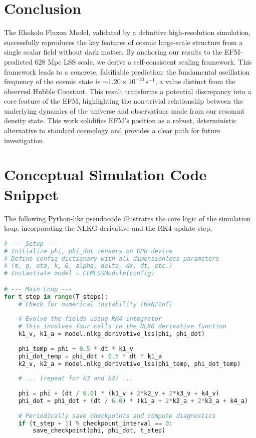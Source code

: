 \documentclass[11pt]{article}
\begin{document}
\section{Conclusion}
The Ehokolo Fluxon Model, validated by a definitive high-resolution simulation, successfully reproduces the key features of cosmic large-scale structure from a single scalar field without dark matter. By anchoring our results to the EFM-predicted 628 Mpc LSS scale, we derive a self-consistent scaling framework. This framework leads to a concrete, falsifiable prediction: the fundamental oscillation frequency of the cosmic state is \(\sim 1.20 \times 10^{-20} \, \text{s}^{-1}\), a value distinct from the observed Hubble Constant. This result transforms a potential discrepancy into a core feature of the EFM, highlighting the non-trivial relationship between the underlying dynamics of the universe and observations made from our resonant density state. This work solidifies EFM's position as a robust, deterministic alternative to standard cosmology and provides a clear path for future investigation.

\appendix
\section{Conceptual Simulation Code Snippet}
The following Python-like pseudocode illustrates the core logic of the simulation loop, incorporating the NLKG derivative and the RK4 update step.

\begin{lstlisting}[language=Python, caption={Conceptual Simulation Logic for EFM LSS}, label=lst:lss_code]
# --- Setup ---
# Initialize phi, phi_dot tensors on GPU device
# Define config dictionary with all dimensionless parameters
# (m, g, eta, k, G, alpha, delta, dx, dt, etc.)
# Instantiate model = EFMLSSModule(config)

# --- Main Loop ---
for t_step in range(T_steps):
    # Check for numerical instability (NaN/Inf)
    
    # Evolve the fields using RK4 integrator
    # This involves four calls to the NLKG derivative function
    k1_v, k1_a = model.nlkg_derivative_lss(phi, phi_dot)
    
    phi_temp = phi + 0.5 * dt * k1_v
    phi_dot_temp = phi_dot + 0.5 * dt * k1_a
    k2_v, k2_a = model.nlkg_derivative_lss(phi_temp, phi_dot_temp)
    
    # ... (repeat for k3 and k4) ...
    
    phi = phi + (dt / 6.0) * (k1_v + 2*k2_v + 2*k3_v + k4_v)
    phi_dot = phi_dot + (dt / 6.0) * (k1_a + 2*k2_a + 2*k3_a + k4_a)
    
    # Periodically save checkpoints and compute diagnostics
    if (t_step + 1) % checkpoint_interval == 0:
        save_checkpoint(phi, phi_dot, t_step)
\end{lstlisting}
\end{document}
